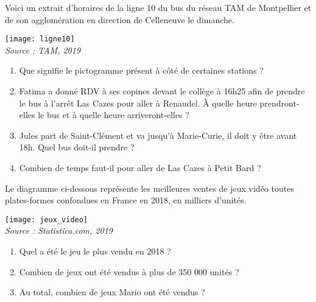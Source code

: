 \begin{colonne*exercice}


\begin{exercice} %
   Voici un extrait d'horaires de la ligne 10 du bus du réseau TAM de Montpellier et de son agglomération en direction de Celleneuve le dimanche.
   \begin{center}
      \texttt{[image: ligne10]} \\ [-2mm]
      \hfill {\footnotesize\it Source : TAM, 2019}
   \end{center}
   \begin{enumerate}
      \item Que signifie le pictogramme présent à côté de certaines stations ?
      \item Fatima a donné RDV à ses copines devant le collège à 16h25 afin de prendre le bus à l'arrêt Las Cazes pour aller à Renaudel. À quelle heure prendront-elles le bus et à quelle heure arriveront-elles ?
      \item Jules part de Saint-Clément et va jusqu'à Marie-Curie, il doit y être avant 18h. Quel bus doit-il prendre ?
      \item Combien de temps faut-il pour aller de Las Cazes à Petit Bard ?
   \end{enumerate}
\end{exercice}

\begin{exercice} %
   Le diagramme ci-dessous représente les meilleures ventes de jeux vidéo toutes plates-formes confondues en France en 2018, en milliers d'unités.
   \begin{center}
      \texttt{[image: jeux\_video]} \\ [-2mm]
      \hfill {\scriptsize\it Source : Statistica.com, 2019}
   \end{center}
   \begin{enumerate}
      \item Quel a été le jeu le plus vendu en 2018 ?
      \item Combien de jeux ont été vendus à plus de 350 000 unités ?
      \item Au total, combien de jeux \og Mario \fg{} ont été vendus ?
   \end{enumerate}
\end{exercice}


\end{colonne*exercice}
